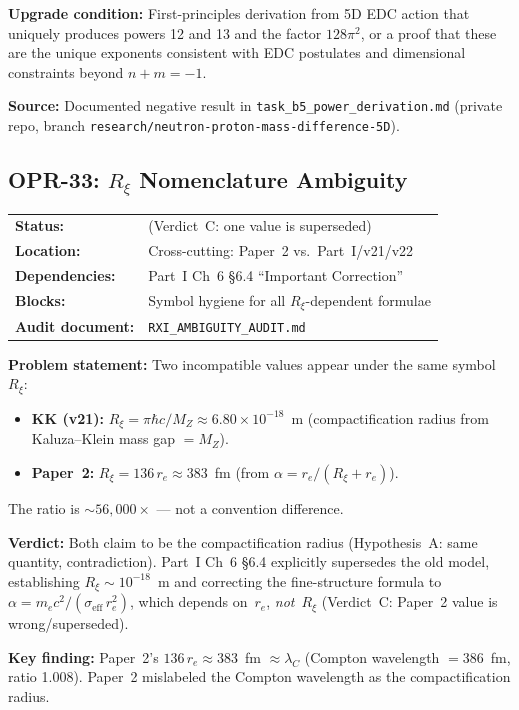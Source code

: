 \textbf{Upgrade condition:} First-principles derivation from 5D EDC action
that uniquely produces powers 12 and 13 and the factor $128\pi^2$,
or a proof that these are the unique exponents consistent with
EDC postulates and dimensional constraints beyond $n + m = -1$.

\textbf{Source:} Documented negative result in \texttt{task\_b5\_power\_derivation.md}
(private repo, branch \texttt{research/neutron-proton-mass-difference-5D}).

\bigskip

\subsection*{OPR-33: $R_\xi$ Nomenclature Ambiguity}
\begin{tabular}{ll}
\textbf{Status:} & \tagResolved{} (Verdict~C: one value is superseded) \\
\textbf{Location:} & Cross-cutting: Paper~2 vs.\ Part~I/v21/v22 \\
\textbf{Dependencies:} & Part~I Ch~6 \S6.4 ``Important Correction'' \\
\textbf{Blocks:} & Symbol hygiene for all $R_\xi$-dependent formulae \\
\textbf{Audit document:} & \texttt{RXI\_AMBIGUITY\_AUDIT.md} \\
\end{tabular}

\textbf{Problem statement:} Two incompatible values appear under the same
symbol~$R_\xi$:
\begin{itemize}[nosep]
\item \textbf{KK (v21):} $R_\xi = \pi\hbar c / M_Z \approx 6.80 \times 10^{-18}$~m
      (compactification radius from Kaluza--Klein mass gap $= M_Z$).
\item \textbf{Paper~2:} $R_\xi = 136\,r_e \approx 383$~fm (from $\alpha = r_e/(R_\xi + r_e)$).
\end{itemize}
The ratio is $\sim 56{,}000\times$ --- not a convention difference.

\textbf{Verdict:} Both claim to be the compactification radius (Hypothesis~A:
same quantity, contradiction). Part~I Ch~6 \S6.4 explicitly supersedes the old
model, establishing $R_\xi \sim 10^{-18}$~m and correcting the fine-structure
formula to $\alpha = m_e c^2 / (\sigma_{\text{eff}}\, r_e^2)$, which depends
on~$r_e$, \emph{not}~$R_\xi$ (Verdict~C: Paper~2 value is wrong/superseded).

\textbf{Key finding:} Paper~2's $136\,r_e \approx 383$~fm $\approx \lambda_C$
(Compton wavelength $= 386$~fm, ratio 1.008). Paper~2 mislabeled the Compton
wavelength as the compactification radius.

